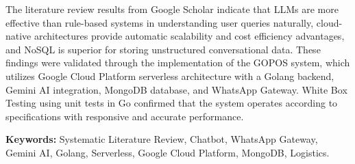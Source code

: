 The literature review results from Google Scholar indicate that LLMs are more effective than rule-based systems in understanding user queries naturally, cloud-native architectures provide automatic scalability and cost efficiency advantages, and NoSQL is superior for storing unstructured conversational data. These findings were validated through the implementation of the GOPOS system, which utilizes Google Cloud Platform serverless architecture with a Golang backend, Gemini AI integration, MongoDB database, and WhatsApp Gateway. White Box Testing using unit tests in Go confirmed that the system operates according to specifications with responsive and accurate performance.

\textbf{Keywords:} Systematic Literature Review, Chatbot, WhatsApp Gateway, Gemini AI, Golang, Serverless, Google Cloud Platform, MongoDB, Logistics.
